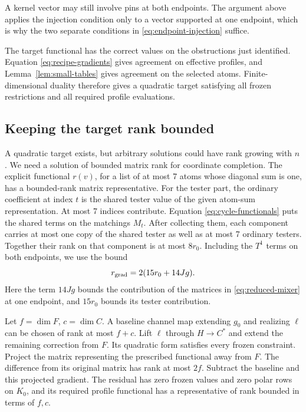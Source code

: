 A kernel vector may still involve pins at both endpoints. The argument
above applies the injection condition only to a vector supported at one
endpoint, which is why the two separate conditions in
\eqref{eq:endpoint-injection} suffice.

The target functional has the correct values on the obstructions just
identified. Equation \eqref{eq:recipe-gradients} gives agreement on
effective profiles, and Lemma~\ref{lem:small-tables} gives agreement
on the selected atoms. Finite-dimensional duality
therefore gives a quadratic target satisfying all frozen restrictions
and all required profile evaluations.

\subsection{Keeping the target rank bounded}

A quadratic target exists, but arbitrary solutions could have rank growing
with \(n\). We need a solution of bounded matrix rank for coordinate completion.
The explicit functional \(r(v)\), for a list of at most 7 atoms whose
diagonal sum is one, has a bounded-rank matrix representative.
For the tester part, the ordinary coefficient at index \(t\) is the shared
tester value of the given atom-sum representation. At most 7 indices
contribute. Equation \eqref{eq:cycle-functionals} puts the shared terms
on the matchings \(M_t\). After collecting them, each component carries
at most one copy of the shared tester as well as at most 7 ordinary
testers. Together their rank on that component is at most \(8r_0\).
Including the \(T^1\) terms on both endpoints, we use the bound
\begin{equation}\label{eq:gradient-rank}
 r_{\rm grad}=2(15r_0+14Jg).
\end{equation}
Here the term \(14Jg\) bounds the contribution of the matrices in
\eqref{eq:reduced-mixer} at one endpoint, and \(15r_0\) bounds its tester
contribution.

Let \(f=\dim F\), \(c=\dim C\). A baseline channel map extending
\(g_0\) and realizing \(\ell\) can be chosen of rank at most \(f+c\).
Lift \(\ell\) through \(H\to C^*\) and extend the remaining correction
from \(F\). Its quadratic form satisfies every frozen constraint.
Project the matrix representing the prescribed functional away from \(F\). The difference from its
original matrix has rank at most \(2f\). Subtract the baseline and this
projected gradient. The residual has zero frozen values and zero polar
rows on \(K_0\), and its required profile functional has a representative
of rank bounded in terms of \(f,c\).

